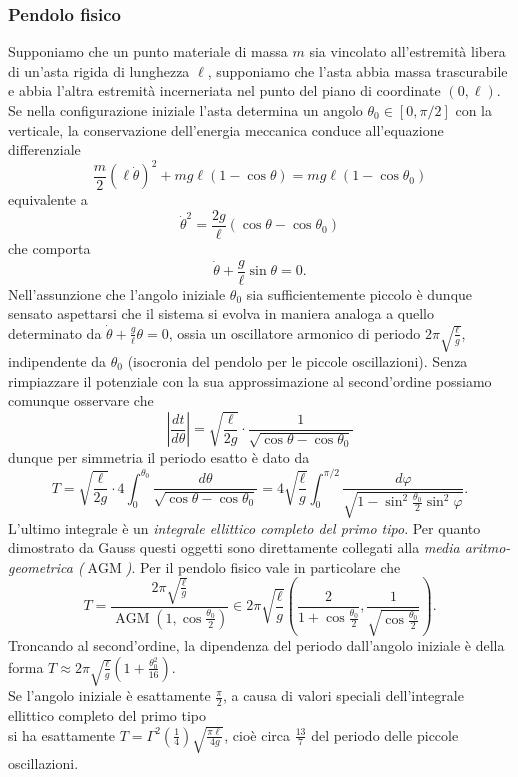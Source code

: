 \documentclass[a4paper,twoside]{article}
\theoremstyle{definition}
\numberwithin{theorem}{section}
\begin{document}
\subsubsection{Pendolo fisico}
Supponiamo che un punto materiale di massa $m$ sia vincolato all'estremità libera di un'asta rigida di lunghezza $\ell$, supponiamo che l'asta abbia massa trascurabile e abbia l'altra estremità incerneriata nel punto del piano di coordinate $(0,\ell)$. Se nella configurazione iniziale l'asta determina un angolo $\theta_0\in[0,\pi/2]$ con la verticale, la conservazione dell'energia meccanica conduce all'equazione differenziale 
$$ \frac{m}{2}\left(\ell\dot{\theta}\right)^2 + mg\ell(1-\cos\theta) = mg\ell(1-\cos\theta_0) $$
equivalente a 
$$ \dot{\theta}^2  = \frac{2g}{\ell}(\cos\theta-\cos\theta_0) $$
che comporta
$$ \dot{\theta}+\frac{g}{\ell}\sin\theta = 0. $$
Nell'assunzione che l'angolo iniziale $\theta_0$ sia sufficientemente piccolo è dunque sensato aspettarsi che il sistema si evolva in maniera analoga a quello determinato da $\dot{\theta}+\frac{g}{\ell}\theta = 0$, ossia un oscillatore armonico di periodo $2\pi\sqrt{\frac{\ell}{g}}$, indipendente da $\theta_0$ (isocronia del pendolo per le piccole oscillazioni). Senza rimpiazzare il potenziale con la sua approssimazione al second'ordine possiamo comunque osservare che 
$$ \left|\frac{dt}{d\theta}\right| = \sqrt{\frac{\ell}{2g}}\cdot\frac{1}{\sqrt{\cos\theta-\cos\theta_0}} $$
dunque per simmetria il periodo esatto è dato da 
$$ T = \sqrt{\frac{\ell}{2g}}\cdot 4\int_{0}^{\theta_0}\frac{d\theta}{\sqrt{\cos\theta-\cos\theta_0}}=4\sqrt{\frac{\ell}{g}}\int_{0}^{\pi/2}\frac{d\varphi}{\sqrt{1-\sin^2\frac{\theta_0}{2}\sin^2\varphi}}. $$
L'ultimo integrale è un \emph{integrale ellittico completo del primo tipo}. Per quanto dimostrato da Gauss questi oggetti sono direttamente collegati alla \emph{media aritmo-geometrica ($\operatorname{AGM}$)}. Per il pendolo fisico vale in particolare che 
$$ T = \frac{2\pi\sqrt{\frac{\ell}{g}}}{\operatorname{AGM}\left(1,\cos\frac{\theta_0}{2}\right)}\in 2\pi\sqrt{\frac{\ell}{g}}\left(\frac{2}{1+\cos\frac{\theta_0}{2}},\frac{1}{\sqrt{\cos\frac{\theta_0}{2}}}\right). $$
Troncando al second'ordine, la dipendenza del periodo dall'angolo iniziale è della forma $T\approx 2\pi\sqrt{\frac{\ell}{g}}\left(1+\frac{\theta_0^2}{16}\right).$\\
Se l'angolo iniziale è esattamente $\frac{\pi}{2}$, a causa di valori speciali dell'integrale ellittico completo del primo tipo\\ si ha esattamente $T=\Gamma^2\left(\frac{1}{4}\right)\sqrt{\frac{\pi\ell}{4g}}$, cioè circa $\frac{13}{7}$ del periodo delle piccole oscillazioni.
\end{document}

